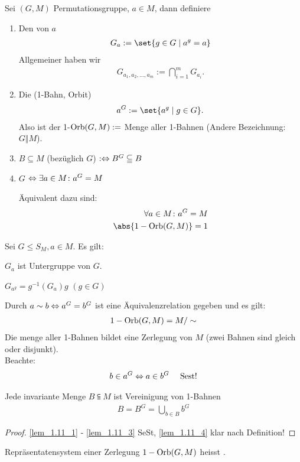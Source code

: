 \begin{definition}
	Sei $(G,M)$ Permutationsgruppe, $a\in M$, dann definiere
	\begin{enumerate}
		\item Den  von $a$
		\begin{align*}
			G_a := \set{g \in G \mid a^g = a}
		\end{align*}
		Allgemeiner haben wir 
		\begin{align*}
			G_{a_1, a_2, \dots, a_m} := \bigcap_{i=1}^m G_{a_i}.
		\end{align*}
		\item Die  (1-Bahn, Orbit)
		\begin{align*}
			a^G := \set{a^g \mid g \in G}.
		\end{align*}
		Also ist der 1-$\operatorname{Orb}(G,M):=$ Menge aller 1-Bahnen (Andere Bezeichnung: $G\Vert M$).
		\item $B \subseteq M$  (bezüglich $G$) $:\Leftrightarrow B^G \subseteqq B$ 
		\item $G$  $\Leftrightarrow \exists a \in M \colon a^G = M$
		\begin{*remark}
			Äquivalent dazu sind:
			\begin{align*}
				\forall a \in M \colon a^G = M\\
				\abs{1-\Orb(G,M)} = 1
			\end{align*}
		\end{*remark}
	\end{enumerate}
\end{definition}
\begin{lemma}
	Sei $G \le S_M, a \in M$. Es gilt:
	\begin{lemmaenum}
		\item $G_a$ ist Untergruppe von $G$. \label{lem_1.11_1}
		\item $G_{a^g} = g^{-1}(G_a)g$ $(g \in G)$ \label{lem_1.11_2}
		\item Durch $a \sim b \Leftrightarrow a^G = b^G$ ist eine Äquivalenzrelation gegeben und es gilt:
		\begin{align*}
			1-\operatorname{Orb}(G,M) = M/\sim
		\end{align*}
		Die menge aller 1-Bahnen bildet eine Zerlegung von $M$ (zwei Bahnen sind gleich oder disjunkt).\\
		Beachte:
		\begin{align*}
			b \in a^G \Leftrightarrow a \in b^G \quad \text{ Sest!}
		\end{align*}
		\label{lem_1.11_3}
		\item Jede invariante Menge $B \subseteqq M$ ist Vereinigung von 1-Bahnen
		\begin{align*}
			B = B^G = \bigcup_{b \in B} b^G
		\end{align*}
		\label{lem_1.11_4}
	\end{lemmaenum}
\end{lemma}
\begin{proof}
	\cref{lem_1.11_1} - \cref{lem_1.11_3} SeSt, \cref{lem_1.11_4} klar nach Definition!
\end{proof}
\begin{remark}
	Repräsentatensystem einer Zerlegung $1-\operatorname{Orb}(G,M)$ heisst .
\end{remark}
